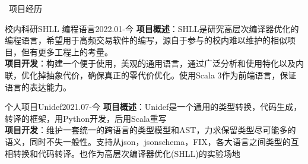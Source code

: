 \documentclass[UTF8]{resume}
\begin{document}
\begin{rSection}{\faUsers~项目经历}

    \begin{rProject}{校内科研}{SHLL 编程语言}{2022.01-今}
        \textbf{项目概述}：SHLL是研究高层次编译器优化的编程语言，希望用于高频交易软件的编写，源自于参与的校内难以维护的相似项目，但有更多工程上的考量。\\
        \textbf{项目开发}：构建一个便于使用，美观的通用语言，通过广泛分析和使用特化以及内联，优化掉抽象代价，确保真正的零代价优化。使用Scala 3作为前端语言，保证语言的表达能力。
    \end{rProject}
    \begin{rProject}{个人项目}{Unidef}{2021.07-今}
        \textbf{项目概述}：Unidef是一个通用的类型转换，代码生成，转译的框架，用Python开发，后用Scala重写\\
        \textbf{项目开发}：维护一套统一的跨语言的类型模型和AST，力求保留类型尽可能多的语义，同时不失一般性。支持从json，jsonschema，FIX，各大语言之间类型的互相转换和代码转译。也作为高层次编译器优化(SHLL)的实验场地
    \end{rProject}


  

\end{rSection}
\end{document}
